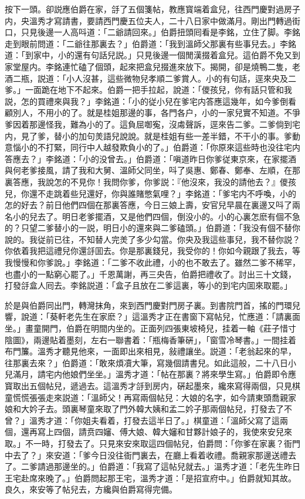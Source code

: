 按下一頭。卻説應伯爵在家，㧱了五個箋帖，教應寳端着盒兒，往西門慶對過房子内，央溫秀才寫請書，要請西門慶五位夫人，二十八日家中做滿月。剛出門轉過街口，只見後邊一人高呌道：「二爺請回來。」伯爵扭頭囘看是李銘，立住了脚。李銘走到眼前問道：「二爺往那裏去？」伯爵道：「我到溫師父那裏有些事兒去。」李銘道：「到家中，小的還有句話兒説。」只見後邊一個閒漢掇着盒兒。這伯爵不免又到家堂屋内。李銘連忙磕了個頭，起來把盒兒掇進來放下。揭開，卻是燒鴨二隻，老酒二瓶，説道：「小人沒甚，這些微物兒孝順二爹賞人。小的有句話，逕來央及二爹。」一面跪在地下不起來。伯爵一把手拉起，說道：「儍孩兒，你有話只管和我説，怎的買禮來與我？」李銘道：「小的従小兒在爹宅内答應這幾年，如今爹倒看顧別人，不用小的了。就是桂姐那邊的事，各門各户，小的一家兒實不知道。不爭爹因着那邊怪我，難為小的了。這負屈啣寃，沒䖏聲訴，逕來告二爹。二爹倘到宅内，見了爹，替小的加句羙語兒說說。就是桂姐有些一差半錯，不干小的事。爹動意惱小的不打緊，同行中人越發欺負小的了。」伯爵道：「你原來這些時也没往宅内答應去？」李銘道：「小的没曾去。」伯爵道：「嗔道昨日你爹従東京來，在家擺酒與何老爹接風，請了我和大舅、溫師父同坐，呌了吳惠、鄭春、鄭奉、左順，在那裏答應，我說怎的不見你！我問你爹，你爹説：『他沒來，我没的請他去？』儍孩兒，你還不走跳着些兒還好，你與誰賭憋氣哩？」李銘道：「爹宅内不呼喚，小的怎的好去？前日他們四個在那裏答應，今日三娘上壽，安官兒早晨在裏邊又呌了兩名小的兒去了。明日老爹擺酒，又是他們四個，倒没小的。小的心裏怎麽有個不急的？只望二爹替小的一説，明日小的還來與二爹磕頭。」伯爵道：「我没有個不替你說的。我従前已往，不知替人完羙了多少勾當。你央及我這些事兒，我不替你説？你依着我把這禮兒你還㧱囬去。你是那裏錢兒，我受你的！你如今親跟了我去，等我慢慢和你爹說。」李銘道：「二爹不收此禮，小的也不敢去了。雖然二爹不稀罕，也盡小的一點窮心罷了。」千恩萬謝，再三央告，伯爵把禮收了。討出三十文錢，打發㧱盒人囘去。李銘説道：「盒子且放在二爹這裏，等小的到宅内囬來取罷。」

於是與伯爵同出門，轉灣抹角，來到西門慶對門房子裏。到書院門首，搖的門環兒響，說道：「葵軒老先生在家麽？」這溫秀才正在書窗下寫帖兒，忙應道：「請裏面坐。」畫童開門，伯爵在明間内坐的。正面列四張東坡椅兒，挂着一軸《莊子惜寸陰圖》，兩邊貼着墨刻，左右一聯書着：「瓶梅香筆硏」，「窗雪冷琴書。」一間挂着布門簾。溫秀才聽見他來，一面即出來相見，敍禮讓坐。説道：「老翁起來的早，往那裏去來？」伯爵道：「敢來煩凟大筆，寫幾個請書兒。如此這般，二十八日小兒滿月，請宅内他娘們坐坐。」溫秀才道：「帖在那裏？將來學生寫。」伯爵即令應寳取出五個帖兒，遞過去。這溫秀才㧱到房内，硏起墨來，纔來寫得兩個，只見棋童慌慌張張走來説道：「溫師父！再寫兩個帖兒：大娘的名字，如今請東頭喬親家娘和大妗子去。頭裏琴童來取了門外韓大姨和孟二妗子那兩個帖兒，打發去了不曾？」溫秀才道：「你姐夫看着，打發去這半日了。」棋童道：「溫師父寫了這兩個，還再寫上四個，請贲四嬸、傅大娘、韓大嬸和甘夥計娘子的，我使來安兒來取。」不一時，打發去了。只見來安來取這四個帖兒，伯爵問：「你爹在家裏？衙門中去了？」來安道：「爹今日没往衙門裏去，在廳上看着收禮。喬親家那邊送禮去了。二爹請過那邊坐的。」伯爵道：「我寫了這帖兒就去。」溫秀才道：「老先生昨日王宅赴席來晚了。」伯爵問起那王宅，溫秀才道：「是招宣府中。」伯爵就知其故。良久，來安等了帖兒去，方纔與伯爵寫得完備。

